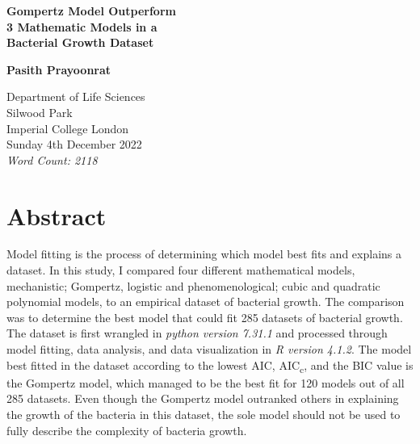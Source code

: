 \documentclass[11pt]{article}
\begin{document}
\begin{titlepage}
	\begin{center}
		\vspace*{1cm}
		
		\begin{Large}
			\textbf{Gompertz Model Outperform\\
       3 Mathematic Models in a\\
       Bacterial Growth Dataset\\}
		\end{Large}
		
		
		\vspace{1.5cm}
		
		\textbf{Pasith Prayoonrat}
		
		\vfill
		
		Department of Life Sciences\\
		Silwood Park\\
		Imperial College London\\
		Sunday 4th December 2022\\
    \textit{Word Count: 2118}
		\vspace{\baselineskip}
		\vfill
		
	\end{center}
\end{titlepage}

\newpage 

  \section{Abstract}
\noindent Model fitting is the process of determining which model best fits and explains a dataset. 
  In this study, I compared four different mathematical models, mechanistic; Gompertz, logistic and phenomenological; cubic and quadratic polynomial models, to an empirical dataset of bacterial growth.
  The comparison was to determine the best model that could fit 285 datasets of bacterial growth.
  The dataset is first wrangled in \textit{python version 7.31.1} and processed through model fitting, data analysis, and data visualization in \textit{R version 4.1.2}.
  The model best fitted in the dataset according to the lowest AIC, AIC\textsubscript{c}, and the BIC value is the Gompertz model, which managed to be the best fit for 120 models out of all 285 datasets.
  Even though the Gompertz model outranked others in explaining the growth of the bacteria in this dataset, the sole model should not be used to fully describe the complexity of bacteria growth.
  \pagebreak
  \pagebreak
\end{document}
